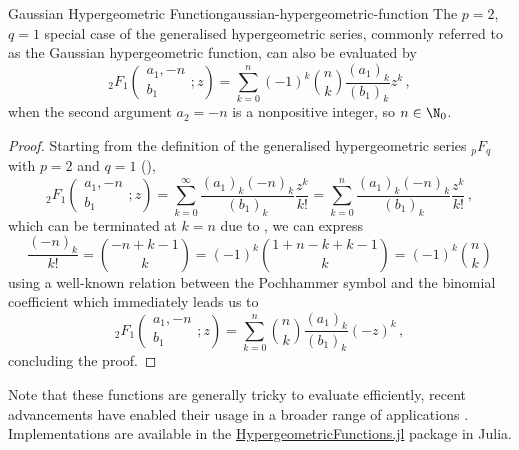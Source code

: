 \begin{lemma}{Gaussian Hypergeometric Function}{gaussian-hypergeometric-function}
  The $p=2$, $q=1$ special case of the generalised hypergeometric series, commonly referred to as the Gaussian hypergeometric function, can also be evaluated by
  $${}_2F_1\left(\begin{matrix}a_{1}, -n \\b_{1}\end{matrix}; z\right) = \sum_{k=0}^n (-1)^k \binom{n}{k} \frac{(a_1)_k}{(b_1)_k}z^k\,,$$
  when the second argument $a_2 = -n$ is a nonpositive integer, so $n \in \N_0$.
\end{lemma}
\begin{proof}
  Starting from the definition of the generalised hypergeometric series ${}_pF_q$ with $p=2$ and $q=1$ (),
  $${}_2F_1\left(\begin{matrix}a_{1}, -n \\b_{1}\end{matrix}; z\right) = \sum_{k=0}^{\infty} \frac{(a_1)_k (-n)_k}{(b_1)_k} \frac{z^k}{k!} = \sum_{k=0}^{n} \frac{(a_1)_k (-n)_k}{(b_1)_k} \frac{z^k}{k!}\,,$$
  which can be terminated at $k=n$ due to , we can express
  $$\frac{(-n)_k}{k!} = \binom{-n+k-1}{k} = (-1)^k \binom{1+n-k+k-1}{k} = (-1)^k \binom{n}{k}$$
  using a well-known relation between the Pochhammer symbol and the binomial coefficient which immediately leads us to
  $${}_2F_1\left(\begin{matrix}a_{1}, -n \\b_{1}\end{matrix}; z\right) = \sum_{k=0}^n \binom{n}{k} \frac{(a_1)_k}{(b_1)_k}(-z)^k\,,$$
  concluding the proof.
\end{proof}

Note that these functions are generally tricky to evaluate efficiently, recent advancements have enabled their usage in a broader range of applications \parencite{2008-hypergeometric-functions-jl-1,2017-hypergeometric-functions-jl-2,2023-hypergeometric-functions-jl-3}.
Implementations are available in the \href{https://github.com/JuliaMath/HypergeometricFunctions.jl}{HypergeometricFunctions.jl} package in Julia.

